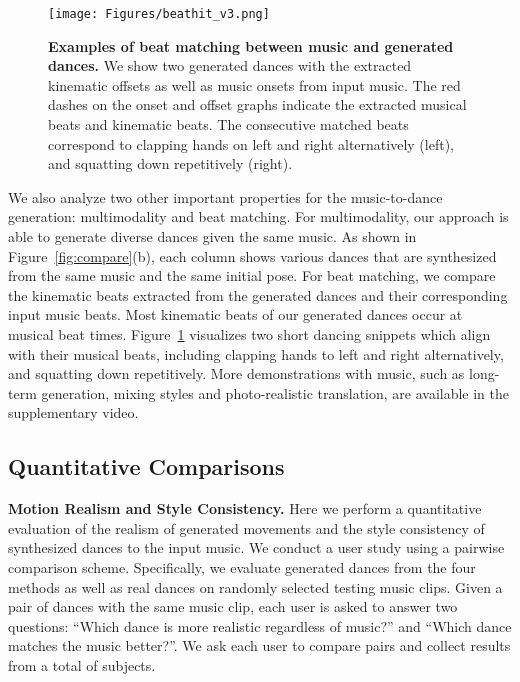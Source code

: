 \documentclass{article}
\newlength\figmargin
\newlength\secmargin
\newlength\subsecmargin
\newcommand{\figref}[1]{Figure~\ref{fig:#1}}
\begin{document}
\begin{figure}
    \centering
    \texttt{[image: Figures/beathit\_v3.png]}
    \caption{\textbf{Examples of beat matching between music and generated dances.}
    We show two generated dances with the extracted kinematic offsets as well as music onsets from input music. 
The red dashes on the onset and offset graphs indicate the extracted musical beats and kinematic beats.
The consecutive matched beats correspond to clapping hands on left and right alternatively (left), and squatting down repetitively (right).
}
    \label{fig:beathit}
    \vspace{\figmargin}
\end{figure}



We also analyze two other important properties for the music-to-dance generation: multimodality and beat matching. 
For multimodality, our approach is able to generate diverse dances given the same music.
As shown in \figref{compare}(b), each column shows various dances that are synthesized from the same music and the same initial pose. 
For beat matching, we compare the kinematic beats extracted from the generated dances and their corresponding input music beats. Most kinematic beats of our generated dances occur at musical beat times.
\figref{beathit} visualizes two short dancing snippets which align with their musical beats, including clapping hands to left and right alternatively, and squatting down repetitively. More demonstrations with music, such as long-term generation, mixing styles and photo-realistic translation, are available in the supplementary video.   

\vspace{\subsecmargin}
\subsection{Quantitative Comparisons}
\label{subsec:quan}
\vspace{\subsecmargin}


\textbf{Motion Realism and Style Consistency.}
Here we perform a quantitative evaluation of the realism of generated movements and the style consistency of synthesized dances to the input music.
We conduct a user study using a pairwise comparison scheme. 
Specifically, we evaluate generated dances from the four methods as well as real dances on  randomly selected testing music clips.
Given a pair of dances with the same music clip, each user is asked to answer two questions: ``Which dance is more realistic regardless of music?'' and ``Which dance matches the music better?''.
We ask each user to compare  pairs and collect results from a total of  subjects. 
\end{document}
